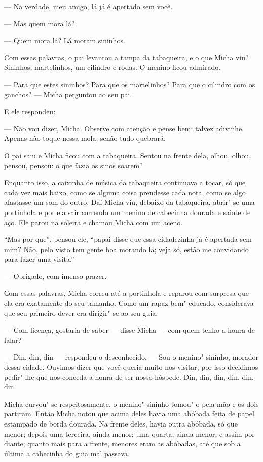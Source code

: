 --- Na verdade, meu amigo, lá já é apertado sem você.

--- Mas quem mora lá?

--- Quem mora lá? Lá moram sininhos.

Com essas palavras, o pai levantou a tampa da tabaqueira, e o que Micha
viu? Sininhos, martelinhos, um cilindro e rodas. O menino ficou admirado.

--- Para que estes sininhos? Para que os martelinhos? Para que o
cilindro com os ganchos? --- Micha perguntou ao seu pai.

E ele respondeu:

--- Não vou dizer, Micha. Observe com atenção e pense bem: talvez
adivinhe. Apenas não toque nessa mola, senão tudo quebrará.

O pai saiu e Micha ficou com a tabaqueira. Sentou na frente dela, olhou,
olhou, pensou, pensou: o que fazia os sinos soarem?

Enquanto isso, a caixinha de música da tabaqueira continuava a tocar, só
que cada vez mais baixo, como se alguma coisa prendesse cada nota, como
se algo afastasse um som do outro. Daí Micha viu, debaixo da tabaqueira,
abrir"-se uma portinhola e por ela sair correndo um menino de cabecinha
dourada e saiote de aço. Ele parou na soleira e chamou Micha com um
aceno.

``Mas por que'', pensou ele, ``papai disse que essa cidadezinha já é
apertada sem mim? Não, pelo visto tem gente boa morando lá; veja só,
estão me convidando para fazer uma visita.''

--- Obrigado, com imenso prazer.

Сom essas palavras, Micha correu até a portinhola e reparou com surpresa
que ela era exatamente do seu tamanho. Como um rapaz bem"-educado,
considerava que seu primeiro dever era dirigir"-se ao seu guia.

--- Com licença, gostaria de saber --- disse Micha --- com quem tenho a
honra de falar?

--- Din, din, din --- respondeu o desconhecido. --- Sou o
menino"-sininho, morador dessa cidade. Ouvimos dizer que você queria
muito nos visitar, por isso decidimos pedir"-lhe que nos conceda a honra
de ser nosso hóspede. Din, din, din, din, din, din.

Micha curvou"-se respeitosamente, o menino"-sininho tomou"-o pela mão e os
dois partiram. Então Micha notou que acima deles havia uma abóbada feita
de papel estampado de borda dourada. Na frente deles, havia outra
abóbada, só que menor; depois uma terceira, ainda menor; uma quarta,
ainda menor, e assim por diante; quanto mais para a frente, menores eram as
abóbadas, até que sob a última a cabecinha do guia mal passava.


